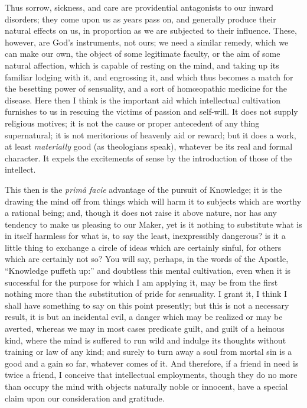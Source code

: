 Thus sorrow, sickness, and care are providential antagonists to our
inward disorders; they come upon us as years pass on, and generally
produce their natural effects on us, in proportion as we are subjected
to their influence. These, however, are God's instruments, not ours;
we need a similar remedy, which we can make our own, the object of
some legitimate faculty, or the aim of some natural affection, which
is capable of resting on the mind, and taking up its familiar lodging
with it, and engrossing it, and which thus becomes a match for the
besetting power of sensuality, and a sort of homœopathic medicine for
the disease. Here then I think is the important aid which intellectual
cultivation furnishes to us in rescuing the victims of passion and
self-will. It does not supply religious motives; it is not the cause
or proper antecedent of any thing supernatural; it is not
meritorious of heavenly aid or reward; but it does a work, at least \emph{materially}
good (as theologians speak), whatever be its real and formal
character. It expels the excitements of sense by the introduction of
those of the intellect.

This then is the \emph{primâ facie} advantage of the pursuit of
Knowledge; it is the drawing the mind off from things which will harm
it to subjects which are worthy a rational being; and, though it does
not raise it above nature, nor has any tendency to make us pleasing to
our Maker, yet is it nothing to substitute what is in itself harmless
for what is, to say the least, inexpressibly dangerous? is it a little
thing to exchange a circle of ideas which are certainly sinful, for
others which are certainly not so? You will say, perhaps, in the words
of the Apostle, ``Knowledge puffeth up:'' and doubtless this
mental cultivation, even when it is successful for the purpose for
which I am applying it, may be from the first nothing more than the
substitution of pride for sensuality. I grant it, I think I shall have
something to say on this point presently; but this is not a necessary
result, it is but an incidental evil, a danger which may be realized
or may be averted, whereas we may in most cases predicate guilt, and
guilt of a heinous kind, where the mind is suffered to run wild and
indulge its thoughts without training or law of any kind; and surely
to turn away a soul from mortal sin is a good and a gain so far,
whatever comes of it. And therefore, if a friend in need is twice a
friend, I conceive that intellectual employments, though they do no
more than occupy the mind with objects naturally noble or innocent,
have a special claim upon our consideration and gratitude.

